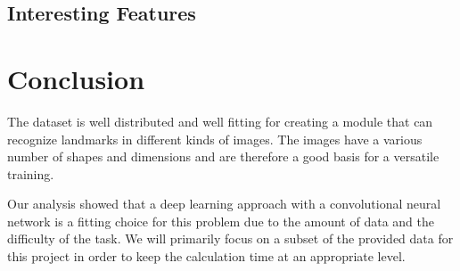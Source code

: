 %
%
%
%
%
%
%
%

\section*{Interesting Features}

\chapter{Conclusion}

The dataset is well distributed and well fitting for creating a module that can recognize landmarks in different kinds of images. The images have a various number of shapes and dimensions and are therefore a good basis for a versatile training.

Our analysis showed that a deep learning approach with a convolutional neural network is a fitting choice for this problem due to the amount of data and the difficulty of the task. We will primarily focus on a subset of the provided data for this project in order to keep the calculation time at an appropriate level.